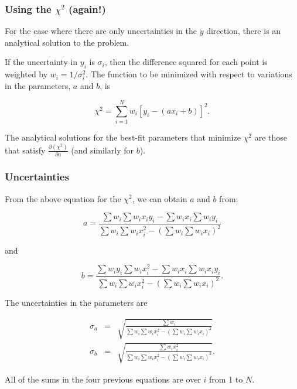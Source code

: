 \documentclass[hyperref={colorlinks=true}]{beamer}
\begin{document}
\begin{frame}%
  \frametitle{Using the $\chi^2$ (again!)}

  For the case where there are only uncertainties in the $y$ direction, there is an analytical solution to the problem.  
  
  \vspace{0.3cm}
  
  If the uncertainty in $y_i$ is $\sigma_i$, then the difference squared for each point is weighted by $w_i=1/\sigma_i^2$. The function to be minimized with respect to variations in the parameters, $a$ and $b$, is  

  \begin{equation}
    \chi^2 = \sum_{i=1}^N w_i \left[y_i - \left(ax_i+b\right)\right]^2.
  \end{equation}
    
The analytical solutions for the best-fit parameters that minimize $\chi^2$ are those that satisfy $\frac{\partial (\chi^2)}{\partial a}$ (and similarly for $b$).
  
\end{frame}



\begin{frame}%
  \frametitle{Uncertainties}

  From the above equation for the $\chi^2$, we can obtain $a$ and $b$ from:

  \begin{equation}
    a=\frac{\sum w_i \sum w_i x_i y_i - \sum w_i x_i \sum w_i y_i}{\sum w_i \sum w_i x_i^2 - \left(\sum w_i \sum w_i x_i\right)^2}
  \end{equation}

  and
  
  \begin{equation}
    b=\frac{\sum w_i y_i \sum w_i x_i^2 - \sum w_i x_i \sum w_i x_i y_i}{\sum w_i \sum w_i x_i^2 - \left(\sum w_i \sum w_i x_i\right)^2}.
  \end{equation}
  
  The uncertainties in the parameters are  

  \begin{eqnarray}
    \sigma_a &=& \sqrt{\frac{\sum w_i}{\sum w_i \sum w_i x_i^2 - \left(\sum w_i \sum w_i x_i\right)^2}} \\
    \sigma_b &=& \sqrt{\frac{\sum w_i x_i^2}{\sum w_i \sum w_i x_i^2 - \left(\sum w_i \sum w_i x_i\right)^2}}.
  \end{eqnarray}
  
All of the sums in the four previous equations are over $i$ from 1 to $N$.  
  
\end{frame}
\end{document}
